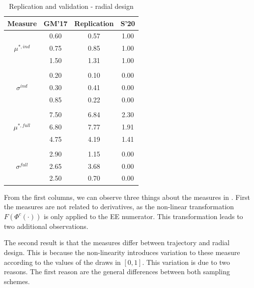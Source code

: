 \documentclass[a4paper,12pt]{article}
\begin{document}
\hspace{1cm} %
\setlength{\tabcolsep}{12pt} %
\begin{table}[H]
	\centering
	\caption{Replication and validation - radial design}
	\label{tab:repval2}
	\renewcommand{\arraystretch}{1.2}%
	\begin{tabular}{cS[table-format=3.2]S[table-format=3.2]S[table-format=3.2]}
		\toprule
		{Measure}     & {GM'17}   & {Replication}  & {S'20} \\ 
		\midrule
		
		& 0.60  & 0.57         &  1.00 \\
		\qquad $\mu^{*,ind}$                               & 0.75  & 0.85         &  1.00 \\
		& 1.50  & 1.31         &  1.00 \\
		&&& \\
		& 0.20   & 0.10         &  0.00 \\
		\qquad $\sigma^{ind}$                            & 0.30   & 0.41         &  0.00 \\
		& 0.85  & 0.22         & 0.00 \\
		&&& \\
		& 7.50  & 6.84         &  2.30 \\
		\qquad $\mu^{*,full}$                              & 6.80   & 7.77         &  1.91 \\
		& 4.75  & 4.19         &  1.41 \\
		&&& \\
		& 2.90  & 1.15         &  0.00 \\
		\qquad $\sigma^{full}$                           & 2.65  & 3.68         &  0.00 \\
		& 2.50   & 0.70         &  0.00 \\ \bottomrule
	\end{tabular}
\end{table}

\newpage
\noindent
From the first columns, we can observe three things about the measures in \cite{ge2017extending}. First the measures are not related to derivatives, as the non-linear transformation $F(\Phi^c(\cdot))$ is only applied to the EE numerator. This transformation leads to two additional observations.


The second result is that the measures differ between trajectory and radial design. This is because the non-linearity introduces variation to these measure according to the values of the draws in $[0,1]$. This variation is due to two reasons. The first reason are the general differences between both sampling schemes.
\end{document}
